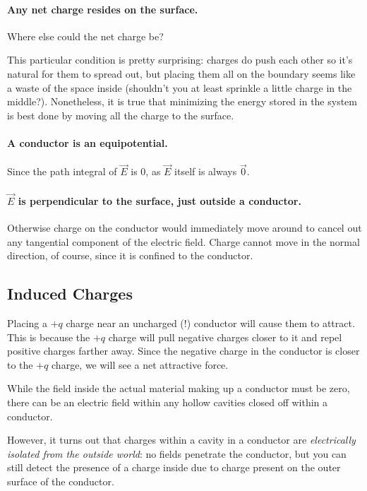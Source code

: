 \paragraph{Any net charge resides on the surface.} Where else could the net charge be?

\begin{remark}
This particular condition is pretty surprising: charges do push each other so it's natural for them to spread out, but placing them all on the boundary seems like a waste of the space inside (shouldn't you at least sprinkle a little charge in the middle?). Nonetheless, it is true that minimizing the energy stored in the system is best done by moving all the charge to the surface.
\end{remark}

\paragraph{A conductor is an equipotential.} Since the path integral of $\vec{E}$ is $0$, as $\vec{E}$ itself is always $\vec{0}$.

\paragraph{$\vec{E}$ is perpendicular to the surface, just outside a conductor.} Otherwise charge on the conductor would immediately move around to cancel out any tangential component of the electric field. Charge cannot move in the normal direction, of course, since it is confined to the conductor.

\subsection{Induced Charges}

Placing a $+q$ charge near an uncharged (!) conductor will cause them to attract. This is because the $+q$ charge will pull negative charges closer to it and repel positive charges farther away. Since the negative charge in the conductor is closer to the $+q$ charge, we will see a net attractive force.

While the field inside the actual material making up a conductor must be zero, there can be an electric field within any hollow cavities closed off within a conductor. 

However, it turns out that charges within a cavity in a conductor are \textit{electrically isolated from the outside world}: no fields penetrate the conductor, but you can still detect the presence of a charge inside due to charge present on the outer surface of the conductor.

